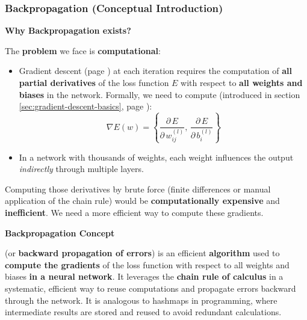 \subsubsection{Backpropagation (Conceptual Introduction)}\label{sec:backpropagation-conceptual-introduction}

\begin{flushleft}
    \textcolor{Green3}{ \textbf{Why Backpropagation exists?}}
\end{flushleft}
\textcolor{Red2}{} The \textbf{problem} we face is \textbf{computational}:
\begin{itemize}
    \item Gradient descent (page \pageref{sec:gradient-descent-basics}) at each iteration requires the computation of \textbf{all partial derivatives} of the loss function $E$ with respect to \textbf{all weights and biases} in the network. Formally, we need to compute (introduced in section \ref{sec:gradient-descent-basics}, page \pageref{eq:gradient-neural-network}):
    \begin{equation*}
        \nabla E(w) = \left\{
            \dfrac{\partial \, E}{\partial \, w_{ij}^{(l)}} , \,
            \dfrac{\partial \, E}{\partial \, b_{i}^{(l)}}
        \right\}
    \end{equation*}
    \item In a network with thousands of weights, each weight influences the output \emph{indirectly} through multiple layers.
\end{itemize}
Computing those derivatives by brute force (finite differences or manual application of the chain rule) would be \textbf{computationally expensive} and \textbf{inefficient}. We need a more efficient way to compute these gradients.

\highspace
\begin{flushleft}
    \textcolor{Green3}{ \textbf{Backpropagation Concept}}
\end{flushleft}
 (or \textbf{backward propagation of errors}) is an efficient \textbf{algorithm} used to \textbf{compute the gradients} of the loss function with respect to all weights and biases \textbf{in a neural network}. It leverages the \textbf{chain rule of calculus} in a systematic, efficient way to reuse computations and propagate errors backward through the network. It is analogous to hashmaps in programming, where intermediate results are stored and reused to avoid redundant calculations.

